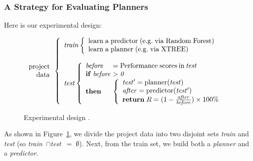\documentclass{sig-alternate}
\newcommand{\fig}[1]{Figure~\ref{fig:#1}}
\begin{document}
\subsubsection{A Strategy for Evaluating Planners}
 
 Here is our experimental design:
 
 \begin{figure}[!h]
{\small 
\[
\begin{array}{r} 
\mathrm{project}\\
\mathrm{data}
\end{array} 
\left\{\begin{array}{l}\mathit{train}
        \left\{\begin{array}{l}
                \mathrm{learn\;a\;}\mathrm{predictor\;}\mathrm{(e.g.\;via \;Random\;Forest)}\\
                \mathrm{learn\;a\;}\mathrm{planner\;}\mathrm{(e.g.\;via \; XTREE)}
              \end{array}\right.
       \\
      ~\\
\mathit{test}  
    \left\{\begin{array}{l@{~}l}
           \mathit{before}& =\mathrm{Performance\; scores \hspace{2pt} in \hspace{2pt}}\mathit{test}\\
           \mathrm{\bf if\;}\mathit{before} & >  \mathit{0}\\
           \mathrm{\bf then} &
           \left\{
            \begin{array}{l}
                \mathit{test'} = \mathrm{planner}(\mathit{test})\\
                \mathit{after} =\mathrm{predictor}(\mathit{test'})\\ 
                \mathrm{{\bf return}\;} R=(1-\frac{\mathit{after}}{\mathit{before}})\times 100 \%
            \end{array}
          \right.
   \end{array}\right.
\end{array} \right. 
\]}
 \caption{Experimental design .}\label{fig:design}
 \end{figure}

As shown in \fig{design}, we divide the
project data  into two disjoint sets {\em train} and {\em test}
(so \mbox{{\em train} $\cap ${\em test} $=\;\emptyset$}).
Next, from the train set, we build both a {\em planner} and
 a {\em  predictor}. 
\end{document}
